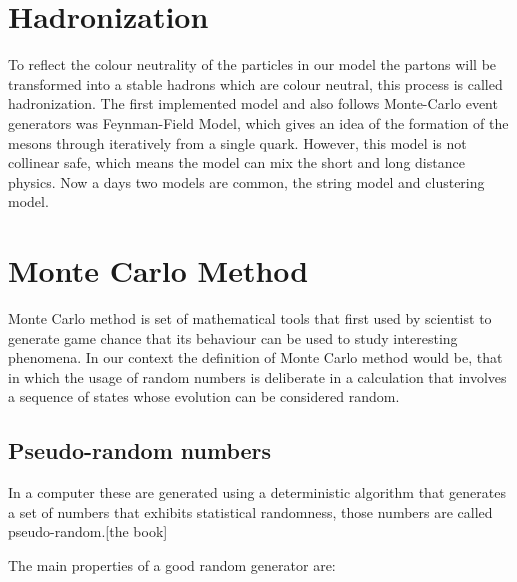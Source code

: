 \section{Hadronization}  

To reflect the colour neutrality of the particles in our model the partons will be transformed into a stable hadrons which are colour neutral, this process is called hadronization. The first implemented model and also follows Monte-Carlo event generators was Feynman-Field Model, which gives an idea of the formation of the mesons through iteratively from a single quark. However, this model is not collinear safe,
which means the model can mix the short and long distance physics. Now a days two models are common, the string model and clustering model\citep{introduction}. 
     
      
\section{Monte Carlo Method}
Monte Carlo method is set of mathematical tools that first used by scientist to generate game chance that its behaviour can be used to study interesting phenomena. In our context the definition of Monte Carlo method would be, that in which the usage of random numbers is deliberate in a calculation that involves a sequence of states whose  evolution can be considered random\citep{introduction}.

\subsection{Pseudo-random numbers}
In a computer these are generated using a deterministic algorithm that generates a set of numbers that exhibits statistical randomness, those numbers are called pseudo-random.[the book] 

The main properties of a good random generator are:

